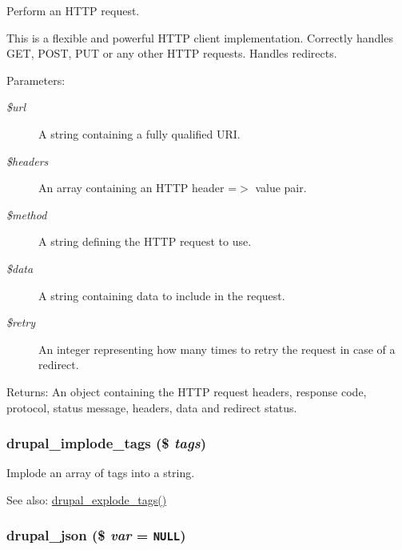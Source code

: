 Perform an HTTP request.

This is a flexible and powerful HTTP client implementation. Correctly handles GET, POST, PUT or any other HTTP requests. Handles redirects.

\begin{Desc}
\item[Parameters:]
\begin{description}
\item[{\em \$url}]A string containing a fully qualified URI. \item[{\em \$headers}]An array containing an HTTP header =$>$ value pair. \item[{\em \$method}]A string defining the HTTP request to use. \item[{\em \$data}]A string containing data to include in the request. \item[{\em \$retry}]An integer representing how many times to retry the request in case of a redirect. \end{description}
\end{Desc}
\begin{Desc}
\item[Returns:]An object containing the HTTP request headers, response code, protocol, status message, headers, data and redirect status. \end{Desc}
\hypertarget{common_8inc_29df41fde25e9fcace627a628806c978}{
\subsubsection[{drupal\_\-implode\_\-tags}]{\setlength{\rightskip}{0pt plus 5cm}drupal\_\-implode\_\-tags (\$ {\em tags})}}
\label{common_8inc_29df41fde25e9fcace627a628806c978}


Implode an array of tags into a string.

\begin{Desc}
\item[See also:]\hyperlink{common_8inc_e5bd302bab285bc819a70737f6121953}{drupal\_\-explode\_\-tags()} \end{Desc}
\hypertarget{common_8inc_7a19d30a73daf3e34ed67000c435afc5}{
\subsubsection[{drupal\_\-json}]{\setlength{\rightskip}{0pt plus 5cm}drupal\_\-json (\$ {\em var} = {\tt NULL})}}
\label{common_8inc_7a19d30a73daf3e34ed67000c435afc5}


